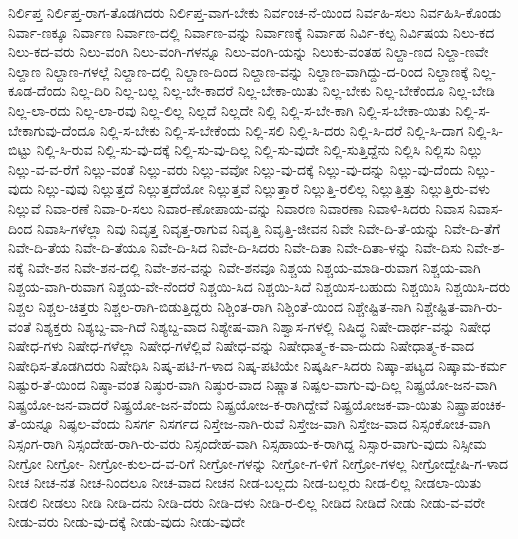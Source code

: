 {ನಿರ್ಲಿಪ್ತ
ನಿರ್ಲಿಪ್ತ-ರಾಗ-ತೊಡಗಿದರು
ನಿರ್ಲಿಪ್ತ-ವಾಗ-ಬೇಕು
ನಿರ್ವಂಚ-ನೆ-ಯಿಂದ
ನಿರ್ವಹಿ-ಸಲು
ನಿರ್ವಹಿಸಿ-ಕೊಂಡು
ನಿರ್ವಾ-ಣಕ್ಕೂ
ನಿರ್ವಾಣ
ನಿರ್ವಾಣ-ದಲ್ಲಿ
ನಿರ್ವಾಣ-ವನ್ನು
ನಿರ್ವಾಣಕ್ಕೆ
ನಿರ್ವಾಹ
ನಿರ್ವಿ-ಕಲ್ಪ
ನಿರ್ವಿಷಯ
ನಿಲು-ಕದ
ನಿಲು-ಕದ-ವರು
ನಿಲು-ವಂಗಿ
ನಿಲು-ವಂಗಿ-ಗಳನ್ನೂ
ನಿಲು-ವಂಗಿ-ಯನ್ನು
ನಿಲುಕು-ವಂತಹ
ನಿಲ್ದಾ-ಣದ
ನಿಲ್ದಾ-ಣವೇ
ನಿಲ್ದಾಣ
ನಿಲ್ದಾಣ-ಗಳಲ್ಲೆ
ನಿಲ್ದಾಣ-ದಲ್ಲಿ
ನಿಲ್ದಾಣ-ದಿಂದ
ನಿಲ್ದಾಣ-ವನ್ನು
ನಿಲ್ದಾಣ-ವಾಗಿದ್ದು-ದ-ರಿಂದ
ನಿಲ್ದಾಣಕ್ಕೆ
ನಿಲ್ಲ-ಕೂಡ-ದೆಂದು
ನಿಲ್ಲ-ದಿರಿ
ನಿಲ್ಲ-ಬಲ್ಲ
ನಿಲ್ಲ-ಬೇ-ಕಾದರೆ
ನಿಲ್ಲ-ಬೇಕಾ-ಯಿತು
ನಿಲ್ಲ-ಬೇಕು
ನಿಲ್ಲ-ಬೇಕೆಂದೂ
ನಿಲ್ಲ-ಬೇಡಿ
ನಿಲ್ಲ-ಲಾ-ರದು
ನಿಲ್ಲ-ಲಾ-ರವು
ನಿಲ್ಲ-ಲಿಲ್ಲ
ನಿಲ್ಲದೆ
ನಿಲ್ಲದೇ
ನಿಲ್ಲಿ
ನಿಲ್ಲಿ-ಸ-ಬೇ-ಕಾಗಿ
ನಿಲ್ಲಿ-ಸ-ಬೇಕಾ-ಯಿತು
ನಿಲ್ಲಿ-ಸ-ಬೇಕಾಗುವು-ದೆಂದೂ
ನಿಲ್ಲಿ-ಸ-ಬೇಕು
ನಿಲ್ಲಿ-ಸ-ಬೇಕೆಂದು
ನಿಲ್ಲಿ-ಸಲಿ
ನಿಲ್ಲಿ-ಸಿ-ದರು
ನಿಲ್ಲಿ-ಸಿ-ದರೆ
ನಿಲ್ಲಿ-ಸಿ-ದಾಗ
ನಿಲ್ಲಿ-ಸಿ-ಬಿಟ್ಟು
ನಿಲ್ಲಿ-ಸಿ-ರುವ
ನಿಲ್ಲಿ-ಸು-ವು-ದಕ್ಕೆ
ನಿಲ್ಲಿ-ಸು-ವು-ದಿಲ್ಲ
ನಿಲ್ಲಿ-ಸು-ವುದೇ
ನಿಲ್ಲಿ-ಸುತ್ತಿದ್ದೆನು
ನಿಲ್ಲಿಸಿ
ನಿಲ್ಲಿಸು
ನಿಲ್ಲು
ನಿಲ್ಲು-ವ-ವ-ರೆಗೆ
ನಿಲ್ಲು-ವಂತೆ
ನಿಲ್ಲು-ವರು
ನಿಲ್ಲು-ವವೋ
ನಿಲ್ಲು-ವು-ದಕ್ಕೆ
ನಿಲ್ಲು-ವು-ದನ್ನು
ನಿಲ್ಲು-ವು-ದೆಂದು
ನಿಲ್ಲು-ವುದು
ನಿಲ್ಲು-ವುವು
ನಿಲ್ಲುತ್ತದೆ
ನಿಲ್ಲುತ್ತದೆಯೋ
ನಿಲ್ಲುತ್ತವೆ
ನಿಲ್ಲುತ್ತಾರೆ
ನಿಲ್ಲುತ್ತಿ-ರಲಿಲ್ಲ
ನಿಲ್ಲುತ್ತಿತ್ತು
ನಿಲ್ಲುತ್ತಿರು-ವಳು
ನಿಲ್ಲುವೆ
ನಿವಾ-ರಣೆ
ನಿವಾ-ರಿ-ಸಲು
ನಿವಾರ-ಣೋಪಾಯ-ವನ್ನು
ನಿವಾರಣ
ನಿವಾರಣಾ
ನಿವಾಳಿ-ಸಿದರು
ನಿವಾಸ
ನಿವಾಸ-ದಿಂದ
ನಿವಾಸಿ-ಗಳೆಲ್ಲಾ
ನಿವು
ನಿವೃತ್ತ
ನಿವೃತ್ತ-ರಾಗುವ
ನಿವೃತ್ತಿ
ನಿವೃತ್ತಿ-ಜೀವನ
ನಿವೇ
ನಿವೇ-ದಿ-ತೆ-ಯನ್ನು
ನಿವೇ-ದಿ-ತೆಗೆ
ನಿವೇ-ದಿ-ತೆಯ
ನಿವೇ-ದಿ-ತೆಯೂ
ನಿವೇ-ದಿ-ಸಿದ
ನಿವೇ-ದಿ-ಸಿದರು
ನಿವೇ-ದಿತಾ
ನಿವೇ-ದಿತಾ-ಳನ್ನು
ನಿವೇ-ದಿಸು
ನಿವೇ-ಶ-ನಕ್ಕೆ
ನಿವೇ-ಶನ
ನಿವೇ-ಶನ-ದಲ್ಲಿ
ನಿವೇ-ಶನ-ವನ್ನು
ನಿವೇ-ಶನವೂ
ನಿಶ್ಚಯ
ನಿಶ್ಚಯ-ಮಾಡಿ-ರುವಾಗ
ನಿಶ್ಚಯ-ವಾಗಿ
ನಿಶ್ಚಯ-ವಾಗಿ-ರುವಾಗ
ನಿಶ್ಚಯ-ವೇ-ನೆಂದರೆ
ನಿಶ್ಚಯಿ-ಸಿದ
ನಿಶ್ಚಯಿ-ಸಿದೆ
ನಿಶ್ಚಯಿಸ-ಬಹುದು
ನಿಶ್ಚಯಿಸಿ
ನಿಶ್ಚಯಿಸಿ-ದರು
ನಿಶ್ಚಲ
ನಿಶ್ಚಲ-ಚಿತ್ತರು
ನಿಶ್ಚಲ-ರಾಗಿ-ಬಿಡುತ್ತಿದ್ದರು
ನಿಶ್ಚಿಂತ-ರಾಗಿ
ನಿಶ್ಚಿಂತೆ-ಯಿಂದ
ನಿಶ್ಚೇಷ್ಟಿತ-ನಾಗಿ
ನಿಶ್ಚೇಷ್ಟಿತ-ವಾಗಿ-ರು-ವಂತೆ
ನಿಶ್ಯಕ್ತರು
ನಿಶ್ಯಬ್ದ-ವಾ-ಗಿದೆ
ನಿಶ್ಯಬ್ದ-ವಾದ
ನಿಶ್ಯೇಷ-ವಾಗಿ
ನಿಶ್ವಾಸ-ಗಳಲ್ಲಿ
ನಿಷಿದ್ಧ
ನಿಷೇ-ದಾರ್ಥ-ವನ್ನು
ನಿಷೇಧ
ನಿಷೇಧ-ಗಳು
ನಿಷೇಧ-ಗಳೆಲ್ಲಾ
ನಿಷೇಧ-ಗಳೆಲ್ಲಿವೆ
ನಿಷೇಧ-ವನ್ನು
ನಿಷೇಧಾತ್ಮ-ಕ-ವಾ-ದುದು
ನಿಷೇಧಾತ್ಮ-ಕ-ವಾದ
ನಿಷೇಧಿಸ-ತೊಡಗಿದರು
ನಿಷೇಧಿಸಿ
ನಿಷ್ಕ-ಪಟಿ-ಗ-ಳಾದ
ನಿಷ್ಕ-ಪಟಿಯೇ
ನಿಷ್ಕರ್ಷಿ-ಸಿದರು
ನಿಷ್ಕಾ-ಪಟ್ಯದ
ನಿಷ್ಕಾಮ-ಕರ್ಮ
ನಿಷ್ಟುರ-ತೆ-ಯಿಂದ
ನಿಷ್ಠಾ-ವಂತ
ನಿಷ್ಠುರ-ವಾಗಿ
ನಿಷ್ಠುರ-ವಾದ
ನಿಷ್ಣಾತ
ನಿಷ್ಪಲ-ವಾಗು-ವು-ದಿಲ್ಲ
ನಿಷ್ಪ್ರಯೋ-ಜನ-ವಾಗಿ
ನಿಷ್ಪ್ರಯೋ-ಜನ-ವಾದರೆ
ನಿಷ್ಪ್ರಯೋ-ಜನ-ವೆಂದು
ನಿಷ್ಪ್ರಯೋಜ-ಕ-ರಾಗಿದ್ದೇವೆ
ನಿಷ್ಪ್ರಯೋಜಕ-ವಾ-ಯಿತು
ನಿಷ್ಪ್ರಾಪಂಚಿಕ-ತೆ-ಯನ್ನೂ
ನಿಷ್ಫಲ-ವೆಂದು
ನಿಸರ್ಗ
ನಿಸರ್ಗದ
ನಿಸ್ತೇಜ-ನಾಗಿ-ರುವೆ
ನಿಸ್ತೇಜ-ವಾಗಿ
ನಿಸ್ತೇಜ-ವಾದ
ನಿಸ್ಸಂಕೋಚ-ವಾಗಿ
ನಿಸ್ಸಂಗ-ರಾಗಿ
ನಿಸ್ಸಂದೇಹ-ರಾಗಿ-ರು-ವರು
ನಿಸ್ಸಂದೇಹ-ವಾಗಿ
ನಿಸ್ಸಹಾಯ-ಕ-ರಾಗಿದ್ದ
ನಿಸ್ಸಾರ-ವಾಗು-ವುದು
ನಿಸ್ಸೀಮ
ನೀಗ್ರೋ
ನೀಗ್ರೋ-
ನೀಗ್ರೋ-ಕುಲ-ದ-ವ-ರಿಗೆ
ನೀಗ್ರೋ-ಗಳನ್ನು
ನೀಗ್ರೋ-ಗ-ಳಿಗೆ
ನೀಗ್ರೋ-ಗಳಲ್ಲ
ನೀಗ್ರೋದ್ವೇಷಿ-ಗ-ಳಾದ
ನೀಚ
ನೀಚ-ನತ
ನೀಚ-ನಿಂದಲೂ
ನೀಚ-ವಾದ
ನೀಚನ
ನೀಡ-ಬಲ್ಲದು
ನೀಡ-ಬಲ್ಲರು
ನೀಡ-ಲಿಲ್ಲ
ನೀಡಲಾ-ಯಿತು
ನೀಡಲಿ
ನೀಡಲು
ನೀಡಿ
ನೀಡಿ-ದನು
ನೀಡಿ-ದರು
ನೀಡಿ-ದಳು
ನೀಡಿ-ರ-ಲಿಲ್ಲ
ನೀಡಿದ
ನೀಡಿದೆ
ನೀಡು
ನೀಡು-ವ-ವರೇ
ನೀಡು-ವರು
ನೀಡು-ವು-ದಕ್ಕೆ
ನೀಡು-ವುದು
ನೀಡು-ವುದೇ
}

